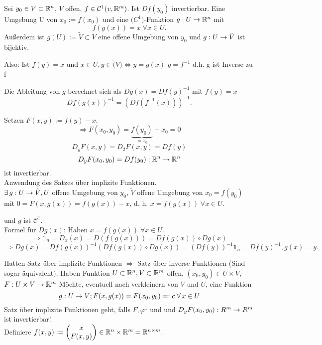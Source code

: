 \documentclass[../ana2.tex]{subfiles}
\begin{document}
\begin{satz}
    Sei \( y_0 \in V \subset \mathbb{R}^n \), \( V \) offen, 
    \( f \in \mathcal{C}^1(v, \mathbb{R}^m) \). Ist \( Df (y_0) \) 
    invertierbar.
    Eine Umgebung U von \(x_0 := f(x_0) \) und eine \(\mathcal(C^1)\)-Funktion 
    \(g:U\rightarrow \mathbb{R}^n\) mit
    \[ f(g(x)) = x \;\forall x \in U. \]
    Außerdem ist \( g(U) := \tilde{V} \subset V \) eine offene Umgebung
    von \( y_0 \) und 
    \( g:U\rightarrow \tilde{V} \) ist bijektiv.
    \begin{bem}
        Also: Ist \(f(y) = x\) und \(x \in U, y \in \tilde(V) \Leftrightarrow y = g(x)\)
        \(g = f^{-1}\) d.h. g ist Inverse zu f
    \end{bem}
    Die Ableitung von \(g\) berechnet sich als 
    \( Dg(x) = Df(y)^{-1} \) mit \( f(y) = x \)
    \[ Df(g(x))^{-1} = (Df(f^{-1}(x)))^{-1}. \]
\end{satz}
\begin{bew}
    Setzen \( F(x,y) := f(y) - x \).
    \[ \Rightarrow F(x_0, y_0) = \underbrace{f(y_0)}_{=x_0} - x_0 = 0 \]
    \[ D_y F(x,y) = D_2 F(x,y) = Df(y) \]
    \[ D_y F(x_0, y_0) 
    = Df(y_0):\mathbb{R}^n\rightarrow \mathbb{R}^n \]
    ist invertierbar.\\
    Anwendung des Satzes über implizite Funktionen.\\
    \( \exists \abb{g}{U}{\tilde{V}}, U \) offene Umgebung 
    von \(y_0\), \(\tilde{V}\) offene Umgebung von \( x_0 = f(y_0) \)
    mit \(0= F(x, g(x)) = f(g(x))-x\), d. h. \( x = f(g(x)) \;\forall x \in U \).

    und \(g\) ist \(\mathcal{C}^1\).\\
    Formel für \(Dg(x)\): Haben \(x = f(g(x)) \;\forall x\in U\).
    \[ \Rightarrow \mathds{1}_n = D_x(x) = D(f(g(x))) 
    = Df(g(x)) \circ D g(x) \]
    \[ \Rightarrow D g(x) = D f(g(x))^{-1}(Df(g(x)) \circ Dg(x))
    = (Df(y))^{-1} \mathds{1}_n = Df(y)^{-1}, g(x) = y. \]
\end{bew}
Hatten Satz über implizite Funktionen 
\( \Rightarrow \) Satz über inverse Funktionen
(Sind sogar äquivalent).
Haben Funktion \(U \subset \mathbb{R}^n, V \subset \mathbb{R}^m  \) offen, 
\( (x_0, y_0) \in U \times V \), \( F:U \times V\rightarrow \mathbb{R}^m \)
Möchte, eventuell nach verkleinern von \(V\) und \(U\), eine Funktion
\[ \abb{g}{U}{V}; F(x, g(x)) = F(x_0, y_0) =: c \; \forall x \in U \]
Satz über implizite Funktionen geht, falls \(F, \varphi^1\) und
und \(D_y F(x_0, y_0):R^m\rightarrow R^m\) ist invertierbar!\\
Definiere \(f(x,y) := \begin{pmatrix} x \\ F(x,y)
\end{pmatrix} \in \mathbb{R}^n \times \mathbb{R}^m = \mathbb{R}^{n \times m} \).
\end{document}
